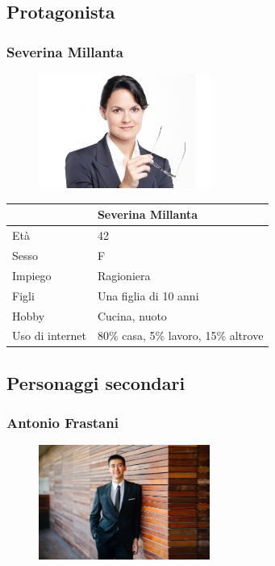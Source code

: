 \documentclass[12pt,italian,]{report}
\begin{document}
\hypertarget{protagonista}{%
\subsection{Protagonista}\label{protagonista}}

\hypertarget{severina-millanta}{%
\subsubsection{Severina Millanta}\label{severina-millanta}}

\begin{figure}[h]
\centering
\includegraphics[width=0.50\textwidth]{img/severina.jpg}
\end{figure}

\begin{longtable}[h]{@{}ll@{}}
\toprule
& Severina Millanta\tabularnewline
\midrule
\endhead
Età & 42\tabularnewline
Sesso & F\tabularnewline
Impiego & Ragioniera\tabularnewline
Figli & Una figlia di 10 anni\tabularnewline
Hobby & Cucina, nuoto\tabularnewline
Uso di internet & 80\% casa, 5\% lavoro, 15\% altrove\tabularnewline
\bottomrule
\end{longtable}

\newpage
\hypertarget{personaggi-secondari}{%
\subsection{Personaggi secondari}\label{personaggi-secondari}}

\hypertarget{antonio-frastani}{%
\subsubsection{Antonio Frastani}\label{antonio-frastani}}

\begin{figure}[h]
\centering
\includegraphics[width=0.5\textwidth,height=\textheight]{img/antonio.jpeg}
\end{figure}
\end{document}
